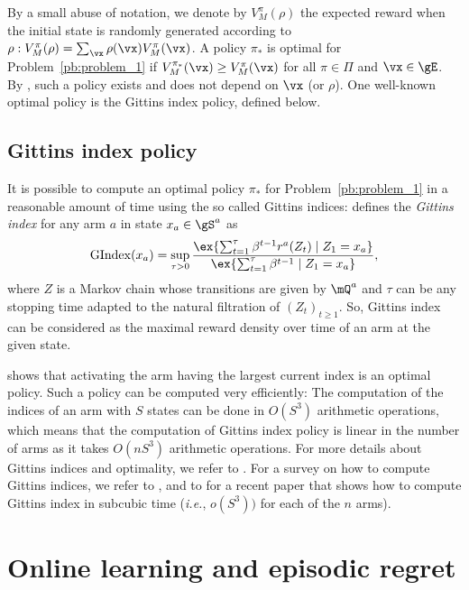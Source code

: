 By a small abuse of notation, we denote by $V_M^\pi(\rho)$ the expected reward when the initial state is randomly generated according to $\rho: V_M^\pi(\rho)=\sum_{\vx}\rho(\vx)V_{M}^\pi(\vx)$.
A policy
$\pi_*$ is optimal for Problem~\ref{pb:problem_1} if $ V_{M}^{\pi_*}(\vx) \ge V_{M}^\pi(\vx) $ for all
$\pi\in\Pi$ and $\vx\in\gE$. By \cite{puterman2014markov},
such a policy exists and does not depend on $\vx$ (or $\rho$). One well-known optimal policy is the Gittins index policy, defined below. 

\subsection{Gittins index policy}
\label{ssec:Gittins}

It is possible to compute an optimal
policy $\pi_*$ for Problem~\ref{pb:problem_1} in a reasonable amount of time using the so called Gittins indices:
\cite{gittins1979bandit} defines the \emph{Gittins index} for any arm $a$ in state $x_a\in\gS^a$ as 
\begin{equation}
    \label{eq:eq_Gindex}
    \mathrm{GIndex}(x_a)=\sup_{\tau>0}\frac{\ex{\sum_{t=1}^{\tau}\beta^{t-1}r^a(Z_{t}) \mid Z_{1}=x_a}}{\ex{\sum_{t=1}^{\tau}\beta^{t-1}\mid Z_{1}=x_a}},
\end{equation}
where $Z$ is a Markov chain whose transitions are given by $\mQ^a$ and $\tau$ can
be any stopping time adapted to the natural filtration of $(Z_t)_{t\ge1}$. So, Gittins index can be considered as the maximal reward density over time of an arm at the given state.

\cite{gittins1979bandit} shows that activating
the arm having the largest current index is an optimal policy. Such a policy
can be computed very efficiently: The computation of the indices of an arm
with $S$ states can be done in \(O(S^3)\) arithmetic operations, which means
that the computation of Gittins index policy is linear in the number of arms
as it takes \(O(nS^3)\) arithmetic operations.
For more details about Gittins indices and optimality, we refer to
\cite{gittins2011multi,weber1992gittins}. For a survey on how to
compute Gittins indices, we refer to \cite{chakravorty2014multi}, and to \cite{gast2022computing} for a recent paper that shows how to compute Gittins index in subcubic time (\emph{i.e.}, $o(S^3))$ for each of the $n$ arms).

\section{Online learning and episodic regret}
\label{sec:problem}

